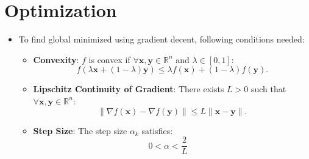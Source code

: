 \documentclass{article}
\begin{document}
\section{Optimization}

\begin{itemize}

\item To find global minimized using gradient decent, following conditions needed:

\begin{itemize}
   \item \textbf{Convexity}: \( f \) is convex if \(\forall \mathbf{x}, \mathbf{y} \in \mathbb{R}^n \) and \( \lambda \in [0,1] \):
   \[
   f(\lambda \mathbf{x} + (1 - \lambda) \mathbf{y}) \leq \lambda f(\mathbf{x}) + (1 - \lambda) f(\mathbf{y}).
   \]

\item \textbf{Lipschitz Continuity of Gradient}: There exists \( L > 0 \) such that \(\forall \mathbf{x}, \mathbf{y} \in \mathbb{R}^n \):
   \[
   \| \nabla f(\mathbf{x}) - \nabla f(\mathbf{y}) \| \leq L \| \mathbf{x} - \mathbf{y} \|.
   \]

\item \textbf{Step Size}: The step size \( \alpha_k \) satisfies:
   \[
   0 < \alpha < \frac{2}{L} \quad 
   \]
\end{itemize}





\end{itemize}
\end{document}
